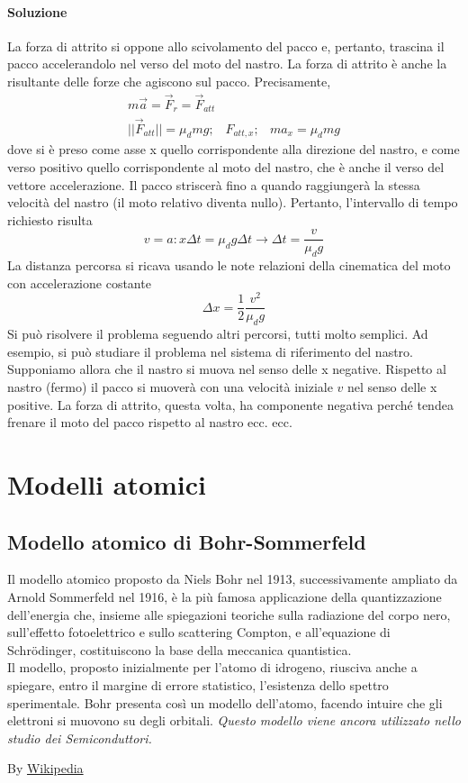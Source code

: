 \documentclass{book}
\begin{document}
\subsubsection{Soluzione}
La forza di attrito si oppone allo scivolamento del pacco e, pertanto, trascina il pacco accelerandolo nel verso del moto del nastro. La forza di attrito è anche la risultante delle forze che agiscono sul pacco. Precisamente,
\begin{eqnarray*}
	m\overrightarrow{a}=\overrightarrow{F}_r=\overrightarrow{F}_{att}\\
	||\overrightarrow{F}_{att}||=\mu_dmg;&F_{att,x};&ma_x=\mu_dmg
\end{eqnarray*}
dove si è  preso come asse x quello corrispondente alla direzione del nastro, e come verso positivo quello corrispondente al moto del nastro, che è anche il verso del vettore accelerazione. Il pacco striscerà fino a quando raggiungerà la stessa velocità del nastro (il moto relativo diventa nullo). Pertanto, l’intervallo di tempo richiesto risulta
\begin{equation*}
	v=a:x\Delta t=\mu_dg\Delta t\to \Delta t=\frac{v}{\mu_dg}
\end{equation*}
La distanza percorsa si ricava usando le note relazioni della cinematica del moto con accelerazione costante
\begin{equation*}
	\Delta x=\frac{1}{2}\frac{v^2}{\mu_dg}
\end{equation*}
Si può risolvere il problema seguendo altri percorsi, tutti molto semplici. Ad esempio, si può studiare il problema nel sistema di riferimento del nastro. Supponiamo allora che il nastro si muova nel senso delle x negative. Rispetto al nastro (fermo) il pacco si muoverà con una velocità iniziale $v$ nel senso delle x positive. La forza di attrito, questa volta, ha componente negativa perché tendea frenare il moto del pacco rispetto al nastro ecc. ecc.


\chapter{Modelli atomici}
\section{Modello atomico di Bohr-Sommerfeld}
Il modello atomico proposto da Niels Bohr nel 1913, successivamente ampliato da Arnold Sommerfeld nel 1916, è la più famosa applicazione della quantizzazione dell'energia che, insieme alle spiegazioni teoriche sulla radiazione del corpo nero, sull'effetto fotoelettrico e sullo scattering Compton, e all'equazione di Schrödinger, costituiscono la base della meccanica quantistica.\\
Il modello, proposto inizialmente per l'atomo di idrogeno, riusciva anche a spiegare, entro il margine di errore statistico, l'esistenza dello spettro sperimentale. Bohr presenta così un modello dell'atomo, facendo intuire che gli elettroni si muovono su degli orbitali. \textit{Questo modello viene ancora utilizzato nello studio dei Semiconduttori.} 
\begin{center}
	By \href{https://it.wikipedia.org/wiki/Modello_atomico_di_Bohr}{Wikipedia}
\end{center}
\end{document}
